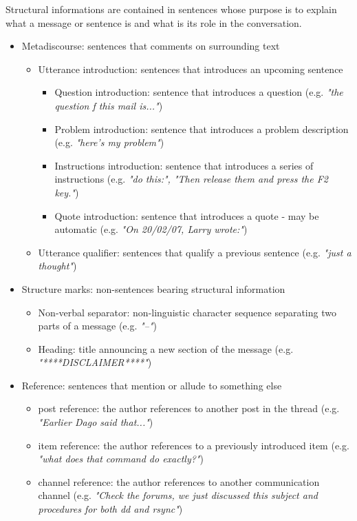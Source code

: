 \documentclass[11pt]{article}
\begin{document}
Structural informations are contained in sentences whose purpose is to explain what a message or sentence is and what is its role in the conversation.

\begin{itemize}
	\item Metadiscourse: sentences that comments on surrounding text
		\begin{itemize}
			\item Utterance introduction: sentences that introduces an upcoming sentence
				\begin{itemize}
					\item Question introduction: sentence that introduces a question (e.g. \textit{"the question f this mail is..."})
					\item Problem introduction: sentence that introduces a problem description (e.g. \textit{"here's my problem"})
					\item Instructions introduction: sentence that introduces a series of instructions (e.g. \textit{"do this:", "Then release them and press the F2 key."})
					\item Quote introduction: sentence that introduces a quote - may be automatic (e.g. \textit{"On 20/02/07, Larry wrote:"})
				\end{itemize}
			\item Utterance qualifier: sentences that qualify a previous sentence (e.g. \textit{"just a thought"})
		\end{itemize}
	\item Structure marks: non-sentences bearing structural information
		\begin{itemize}
			\item Non-verbal separator: non-linguistic character sequence separating two parts of a message (e.g. \textit{"--"})
			\item Heading: title announcing a new section of the message (e.g. \textit{"****DISCLAIMER****"})
		\end{itemize}
	\item Reference: sentences that mention or allude to something else
		\begin{itemize}
			\item post reference: the author references to another post in the thread (e.g. \textit{"Earlier Dago said that..."})
			\item item reference: the author references to a previously introduced item (e.g. \textit{"what does that command do exactly?"})
			\item channel reference: the author references to another communication channel (e.g. \textit{"Check the forums, we just discussed this subject and procedures for both dd and rsync"})

\end{itemize}
\end{itemize}
\end{document}
